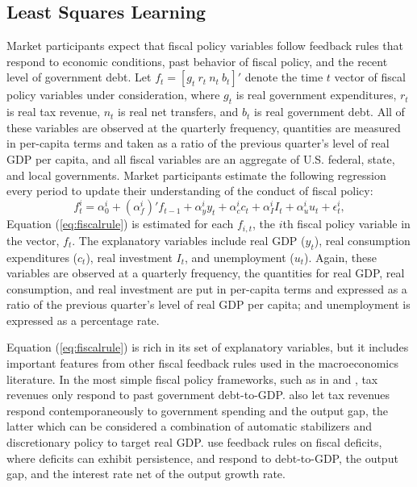 \documentclass[11pt]{article}
\newcommand{\beq}{\begin{equation}}
\newcommand{\eeq}{\end{equation}}
\newcommand{\citee}[1]{\citet{#1}}
\begin{document}
\subsection{Least Squares Learning}
Market participants expect that fiscal policy variables follow feedback rules that respond to economic conditions, past behavior of fiscal policy, and the recent level of government debt.  Let $f_t = [g_t~ r_t~ n_t~ b_t]'$ denote the time $t$ vector of fiscal policy variables under consideration, where $g_t$ is real government expenditures, $r_t$ is real tax revenue, $n_t$ is real net transfers, and $b_t$ is real government debt.  All of these variables are observed at the quarterly frequency, quantities are measured in per-capita terms and taken as a ratio of the previous quarter's level of real GDP per capita, and all fiscal variables are an aggregate of U.S. federal, state, and local governments.  Market participants estimate the following regression every period to update their understanding of the conduct of fiscal policy:
\beq \label{eq:fiscalrule} f^{i}_{t} = \alpha^i_{0} + (\alpha^{i}_{f})' f_{t-1} + \alpha^i_{y} y_t + \alpha^i_c c_t + \alpha^i_I I_t + \alpha^i_u u_t + \epsilon^i_{t}, \eeq
Equation (\ref{eq:fiscalrule}) is estimated for each $f_{i,t}$, the $i$th fiscal policy variable in the vector, $f_t$.  The explanatory variables include real GDP ($y_t$), real consumption expenditures ($c_t$), real investment $I_t$, and unemployment ($u_t$).  Again, these variables are observed at a quarterly frequency, the quantities for real GDP, real consumption, and real investment are put in per-capita terms and expressed as a ratio of the previous quarter's level of real GDP per capita; and unemployment is expressed as a percentage rate.  

Equation (\ref{eq:fiscalrule}) is rich in its set of explanatory variables, but it includes important features from other fiscal feedback rules used in the macroeconomics literature.  In the most simple fiscal policy frameworks, such as in \citee{SchmittGrohe2007} and \cite{ChungDavigLeeper2007}, tax revenues only respond to past government debt-to-GDP.  \citee{DavigLeeper2006} also let tax revenues respond contemporaneously to government spending and the output gap, the latter which can be considered a combination of automatic stabilizers and discretionary policy to target real GDP.  \citee{Favero2003} use feedback rules on fiscal deficits, where deficits can exhibit persistence, and respond to debt-to-GDP, the output gap, and the interest rate net of the output growth rate.  
\end{document}
